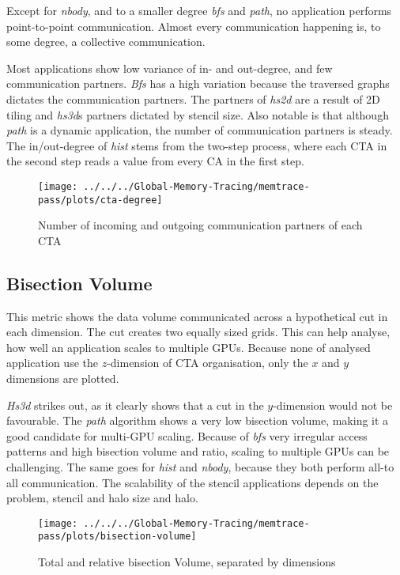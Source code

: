 Except for \textit{nbody}, and to a smaller degree \textit{bfs} and \textit{path}, no application performs point-to-point communication. Almost every communication happening is, to some degree, a collective communication.

Most applications show low variance of in- and out-degree, and few communication partners. \textit{Bfs} has a high variation because the traversed graphs dictates the communication partners. The partners of \textit{hs2d} are a result of 2D tiling and \textit{hs3d}s partners
dictated by stencil size. Also notable is that although \textit{path} is a dynamic application, the number of communication partners is steady. The in/out-degree of \textit{hist} stems from the two-step process, where each CTA in the second step reads a value from
every CA in the first step.

\begin{figure}[t]
	\texttt{[image: ../../../Global-Memory-Tracing/memtrace-pass/plots/cta-degree]}
	\caption{Number of incoming and outgoing communication partners of each CTA}
	\label{fig:Cta-degree}
\end{figure}
\subsection{Bisection Volume}
This metric shows the data volume communicated across a hypothetical cut in each dimension. The cut creates two equally sized grids. This can help analyse, how well an application scales to multiple GPUs. Because none of analysed application use the $z$-dimension of CTA organisation, only the $x$ and $y$ dimensions are plotted. 

\textit{Hs3d} strikes out, as it clearly shows that a cut in the $y$-dimension would not be favourable. The \textit{path} algorithm shows a very low bisection volume, making it a good candidate for multi-GPU scaling.
Because of \textit{bfs} very irregular access patterns and high bisection volume and ratio, scaling to multiple GPUs can be challenging. The same goes for \textit{hist} and \textit{nbody}, because they both
perform all-to all communication. The scalability of the stencil applications depends on the problem, stencil and halo size and halo.
\begin{figure}[t]
	\centering
	\texttt{[image: ../../../Global-Memory-Tracing/memtrace-pass/plots/bisection-volume]}
	\caption{Total and relative bisection Volume, separated by dimensions}
	\label{bisection-vols}
\end{figure}

